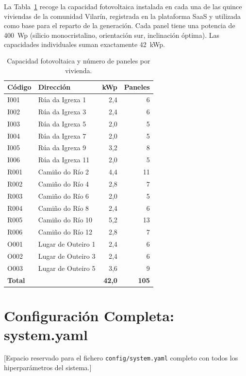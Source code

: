 \documentclass[12pt, a4paper, twoside]{report}
\begin{document}
La Tabla~\ref{tab:capacidad} recoge la capacidad fotovoltaica instalada en cada
una de las quince viviendas de la comunidad Vilarín, registrada en la plataforma
SaaS y utilizada como base para el reparto de la generación. Cada panel tiene
una potencia de \SI{400}{Wp} (silicio monocristalino, orientación sur,
inclinación óptima). Las capacidades individuales suman exactamente \SI{42}{kWp}.

\begin{table}[H]
\centering
\caption{Capacidad fotovoltaica y número de paneles por vivienda.}
\label{tab:capacidad}
\begin{tabular}{llrr}
\toprule
\textbf{Código} & \textbf{Dirección} & \textbf{kWp} & \textbf{Paneles} \\
\midrule
I001 & Rúa da Igrexa 1 & 2{,}4 & 6 \\
I002 & Rúa da Igrexa 3 & 2{,}4 & 6 \\
I003 & Rúa da Igrexa 5 & 2{,}0 & 5 \\
I004 & Rúa da Igrexa 7 & 2{,}0 & 5 \\
I005 & Rúa da Igrexa 9 & 3{,}2 & 8 \\
I006 & Rúa da Igrexa 11 & 2{,}0 & 5 \\
R001 & Camiño do Río 2 & 4{,}4 & 11 \\
R002 & Camiño do Río 4 & 2{,}8 & 7 \\
R003 & Camiño do Río 6 & 2{,}0 & 5 \\
R004 & Camiño do Río 8 & 2{,}4 & 6 \\
R005 & Camiño do Río 10 & 5{,}2 & 13 \\
R006 & Camiño do Río 12 & 2{,}8 & 7 \\
O001 & Lugar de Outeiro 1 & 2{,}4 & 6 \\
O002 & Lugar de Outeiro 3 & 2{,}4 & 6 \\
O003 & Lugar de Outeiro 5 & 3{,}6 & 9 \\
\midrule
\textbf{Total} & & \textbf{42{,}0} & \textbf{105} \\
\bottomrule
\end{tabular}
\end{table}

\chapter{Configuración Completa: system.yaml}
\label{app:config}
[Espacio reservado para el fichero \texttt{config/system.yaml} completo con
todos los hiperparámetros del sistema.]
\end{document}
